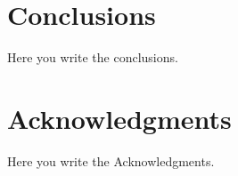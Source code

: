 \documentclass[12pt,a4paper]{report}
\begin{document}





\begingroup
    \hypersetup{linkcolor=black}
    \renewcommand\contentsname{\bfseries Contents}
    \tableofcontents
\endgroup










\chapter*{Conclusions}
\label{chap:conclusions}

Here you write the conclusions.

\chapter*{Acknowledgments}
\label{chap:Acknowledgments}

Here you write the Acknowledgments.



\printbibliography[heading=bibintoc]

\thispagestyle{plain}
\end{document}
